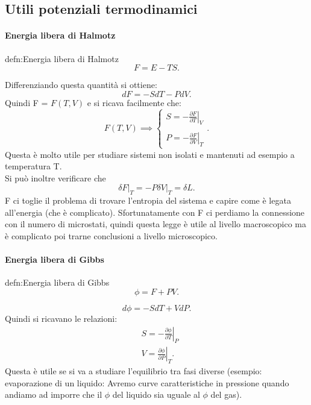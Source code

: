 \subsection{Utili potenziali termodinamici}
\paragraph{Energia libera di Halmotz}%
\begin{defn}{defn:Energia libera di Halmotz}
\[
	F = E - TS
.\]
\end{defn}
Differenziando questa quantità si ottiene:
\[
	dF = -SdT - PdV
.\] 
Quindi F = $F\left( T,V \right)$ e si ricava facilmente che:
\[
	F\left( T,V \right) \implies 
	\begin{cases}
	S = - \left.\frac{\partial F}{\partial T} \right|_{V} \\ 
		\\
	P = - \left.\frac{\partial F}{\partial V} \right|_{T}
	\end{cases}
.\] 
Questa è molto utile per studiare sistemi non isolati e mantenuti ad esempio a temperatura T.\\
Si può inoltre verificare che 
\[
	\left.\delta F\right|_{T} = -P \left.\delta V\right|_{T} = \delta L
.\] 
F ci toglie il problema di trovare l'entropia del sistema e capire come è legata all'energia (che è complicato). Sfortunatamente con F ci perdiamo la connessione con il numero di microstati, quindi questa legge è utile al livello macroscopico ma è complicato poi trarne conclusioni a livello microscopico.
\paragraph{Energia libera di Gibbs}%
\begin{defn}{defn:Energia libera di Gibbs}
\[
	\phi = F + PV
.\] 
\end{defn}
\[
	d\phi = -SdT + VdP
.\] 
Quindi si ricavano le relazioni:
\begin{align}
	&S = -\left.\frac{\partial \phi}{\partial T}\right|_{P}\\
	&V = \left.\frac{\partial \phi}{\partial P} \right|_{T}
.\end{align}
Questa è utile se si va a studiare l'equilibrio tra fasi diverse (esempio: evaporazione di un liquido: Avremo curve caratteristiche in pressione quando andiamo ad imporre che il $\phi$ del liquido sia uguale al $\phi$ del gas).\\
